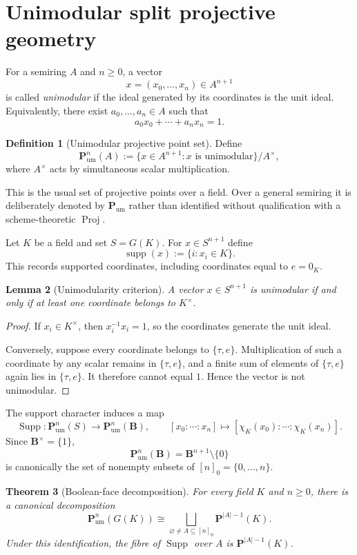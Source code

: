 \documentclass[11pt]{amsart}
\numberwithin{equation}{section}
\newtheorem{theorem}{Theorem}[section]
\newtheorem{lemma}[theorem]{Lemma}
\theoremstyle{definition}
\newtheorem{definition}[theorem]{Definition}
\newcommand{\B}{\mathbf B}
\newcommand{\Proj}{\operatorname{Proj}}
\newcommand{\supp}{\operatorname{supp}}
\newcommand{\Supp}{\operatorname{Supp}}
\newcommand{\Pum}{\mathbf P_{\mathrm{um}}}
\begin{document}
\section{Unimodular split projective geometry}

For a semiring $A$ and $n\ge0$, a vector
\[
x=(x_0,\dots,x_n)\in A^{n+1}
\]
is called \emph{unimodular} if the ideal generated by its coordinates is the unit ideal.  Equivalently, there exist $a_0,\dots,a_n\in A$ such that
\[
a_0x_0+\cdots+a_nx_n=1.
\]

\begin{definition}[Unimodular projective point set]\label{def:unimodular-projective}
Define
\[
\Pum^n(A)
:=
\{x\in A^{n+1}:x\text{ is unimodular}\}/A^\times,
\]
where $A^\times$ acts by simultaneous scalar multiplication.
\end{definition}

This is the usual set of projective points over a field.  Over a general semiring it is deliberately denoted by $\Pum$ rather than identified without qualification with a scheme-theoretic $\Proj$.

Let $K$ be a field and set $S=G(K)$.  For $x\in S^{n+1}$ define
\[
\supp(x):=\{i:x_i\in K\}.
\]
This records supported coordinates, including coordinates equal to $e=0_K$.

\begin{lemma}[Unimodularity criterion]\label{lem:unimodularity-criterion}
A vector $x\in S^{n+1}$ is unimodular if and only if at least one coordinate belongs to $K^\times$.
\end{lemma}

\begin{proof}
If $x_i\in K^\times$, then $x_i^{-1}x_i=1$, so the coordinates generate the unit ideal.

Conversely, suppose every coordinate belongs to $\{\tau,e\}$.  Multiplication of such a coordinate by any scalar remains in $\{\tau,e\}$, and a finite sum of elements of $\{\tau,e\}$ again lies in $\{\tau,e\}$.  It therefore cannot equal $1$.  Hence the vector is not unimodular.
\end{proof}

The support character induces a map
\[
\Supp:\Pum^n(S)\longrightarrow\Pum^n(\B),
\qquad
[x_0:\cdots:x_n]
\longmapsto
[\chi_K(x_0):\cdots:\chi_K(x_n)].
\]
Since $\B^\times=\{1\}$,
\[
\Pum^n(\B)=\B^{n+1}\setminus\{0\}
\]
is canonically the set of nonempty subsets of $[n]_0=\{0,\dots,n\}$.

\begin{theorem}[Boolean-face decomposition]\label{thm:projective-face-decomposition}
For every field $K$ and $n\ge0$, there is a canonical decomposition
\[
\boxed{
\Pum^n(G(K))
\cong
\bigsqcup_{\varnothing\neq A\subseteq[n]_0}
\mathbf P^{|A|-1}(K).}
\]
Under this identification, the fibre of $\Supp$ over $A$ is $\mathbf P^{|A|-1}(K)$.
\end{theorem}
\end{document}
